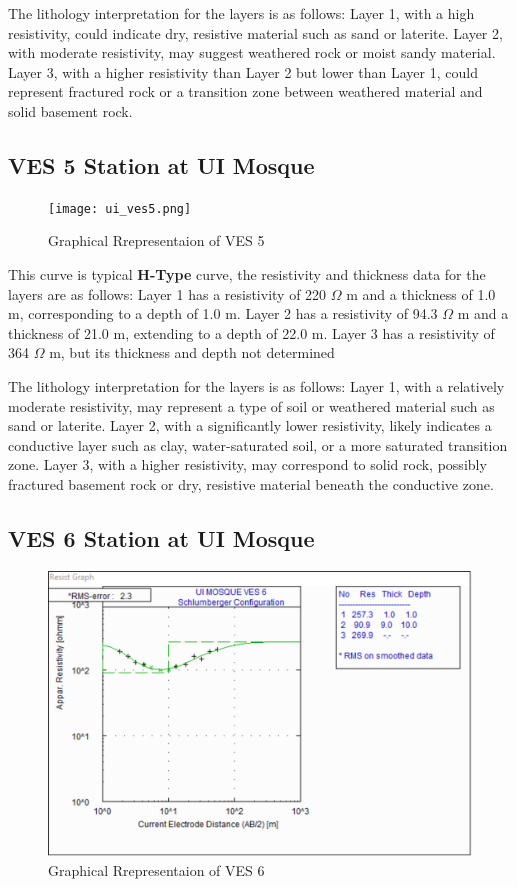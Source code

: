 \documentclass[12pt,a4paper]{report}
\begin{document}
The lithology interpretation for the layers is as follows: Layer 1, with a high resistivity, could indicate dry, resistive material such as sand or laterite. Layer 2, with moderate resistivity, may suggest weathered rock or moist sandy material. Layer 3, with a higher resistivity than Layer 2 but lower than Layer 1, could represent fractured rock or a transition zone between weathered material and solid basement rock.

\subsection{VES 5 Station at UI Mosque}

\begin{figure}[H]
    \centering
    \texttt{[image: ui\_ves5.png]}
    \caption{Graphical Rrepresentaion of VES 5}
    \label{fig:VES_5_Curve}
\end{figure}

This curve is typical \textbf{H-Type} curve, the resistivity and thickness data for the layers are as follows: Layer 1 has a resistivity of 220 $\Omega$ m and a thickness of 1.0 m, corresponding to a depth of 1.0 m. Layer 2 has a resistivity of 94.3 $\Omega$ m and a thickness of 21.0 m, extending to a depth of 22.0 m. Layer 3 has a resistivity of 364 $\Omega$ m, but its thickness and depth not determined

The lithology interpretation for the layers is as follows: Layer 1, with a relatively moderate resistivity, may represent a type of soil or weathered material such as sand or laterite. Layer 2, with a significantly lower resistivity, likely indicates a conductive layer such as clay, water-saturated soil, or a more saturated transition zone. Layer 3, with a higher resistivity, may correspond to solid rock, possibly fractured basement rock or dry, resistive material beneath the conductive zone.

\subsection{VES 6 Station at UI Mosque}

\begin{figure}[H]
    \centering
    \includegraphics[width=1.0\textwidth]{ui_ves6.png}
    \caption{Graphical Rrepresentaion of VES 6}
    \label{fig:VES_6_Curve}
\end{figure}
\end{document}
